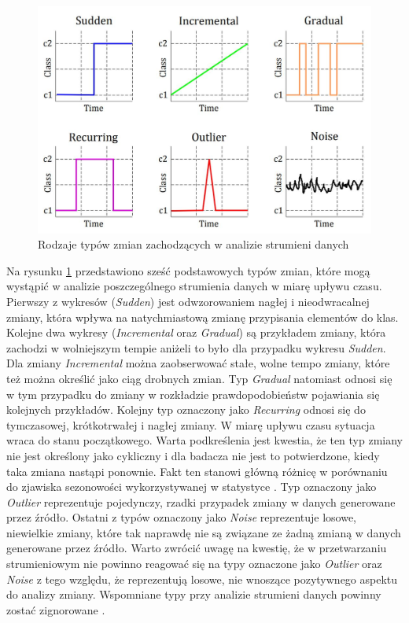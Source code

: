 \begin{figure}[h] 
    \centering
    \includegraphics[width=14cm]{figures/types_of_drift2.JPG}
    \caption{Rodzaje typów zmian zachodzących w analizie strumieni danych \cite{Article:DriftType4}}\label{Figure:DriftTypes}
\end{figure}

\noindent Na rysunku \ref{Figure:DriftTypes} przedstawiono sześć podstawowych typów zmian, które mogą wystąpić w analizie poszczególnego strumienia danych w miarę upływu czasu. Pierwszy z wykresów (\textit{Sudden}) jest odwzorowaniem nagłej i nieodwracalnej zmiany, która wpływa na natychmiastową zmianę przypisania elementów do klas. Kolejne dwa wykresy (\textit{Incremental} oraz \textit{Gradual}) są przykładem zmiany, która zachodzi w wolniejszym tempie aniżeli to było dla przypadku wykresu \textit{Sudden}. Dla zmiany \textit{Incremental} można zaobserwować stałe, wolne tempo zmiany, które też można określić jako ciąg drobnych zmian. Typ \textit{Gradual} natomiast odnosi się w tym przypadku do zmiany w rozkładzie prawdopodobieństw pojawiania się kolejnych przykładów. Kolejny typ oznaczony jako \textit{Recurring} odnosi się do tymczasowej, krótkotrwałej i nagłej zmiany. W miarę upływu czasu sytuacja wraca do stanu początkowego. Warta podkreślenia jest kwestia, że ten typ zmiany nie jest określony jako cykliczny i dla badacza nie jest to potwierdzone, kiedy taka zmiana nastąpi ponownie. Fakt ten stanowi główną różnicę w porównaniu do zjawiska sezonowości wykorzystywanej w statystyce \cite{PHD:Zliobaite}. Typ oznaczony jako \textit{Outlier} reprezentuje pojedynczy, rzadki przypadek zmiany w danych generowane przez źródło. Ostatni z typów oznaczony jako \textit{Noise} reprezentuje losowe, niewielkie zmiany, które tak naprawdę nie są związane ze żadną zmianą w danych generowane przez źródło. Warto zwrócić uwagę na kwestię, że w przetwarzaniu strumieniowym nie powinno reagować się na typy oznaczone jako \textit{Outlier} oraz \textit{Noise} z tego względu, że reprezentują losowe, nie wnoszące pozytywnego aspektu do analizy zmiany. Wspomniane typy przy analizie strumieni danych powinny zostać zignorowane \cite{DBrzezinski}\cite{Prezentacja:Strumienie}.

